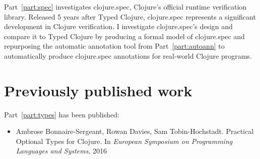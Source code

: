 Part~\ref{part:spec} investigates clojure.spec, Clojure's official runtime verification library.
Released 5 years after Typed Clojure, clojure.spec represents a significant development in Clojure
verification. I investigate clojure.spec's design and compare it to Typed Clojure
by producing a formal model of clojure.spec and repurposing the automatic annotation tool 
from Part~\ref{part:autoann} to automatically produce clojure.spec annotations for real-world Clojure programs.
%


\section*{Previously published work}

Part~\ref{part:types} has been published:
%
\begin{itemize}
  \item Ambrose Bonnaire-Sergeant, Rowan Davies, Sam Tobin-Hochstadt.
        Practical Optional Types for Clojure.
        In \textit{European Symposium on Programming Languages and Systems}, 2016
\end{itemize}
